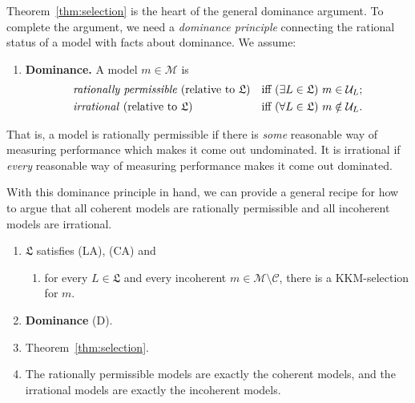 \documentclass[11pt]{article}
\theoremstyle{definition}
\theoremstyle{remark}
\newcommand{\M}{\mathcal M}
\newcommand{\C}{\mathcal C}
\newcommand{\U}{\mathcal U}
\newcommand{\Lf}{\mathfrak L}
\begin{document}
Theorem~\ref{thm:selection} is the heart of the general dominance argument. To complete the argument, we need a \textit{dominance principle} connecting the rational status of a model with facts about dominance. We assume:
\begin{enumerate}[label=\textbf{(D)},leftmargin=*]
\item\label{principle:dominance} \textbf{Dominance.} A model $m\in\M$ is
\begin{align*}
&\text{\emph{rationally permissible} (relative to $\Lf$)}&&\text{iff }(\exists L\in\Lf)\ m\in\U_L;\\
&\text{\emph{irrational} (relative to $\Lf$)}&&\text{iff }(\forall L\in\Lf)\ m\notin\U_L.
\end{align*}
\end{enumerate}
That is, a model is rationally permissible if there is \textit{some} reasonable way of measuring performance which makes it come out undominated. It is irrational if \textit{every} reasonable way of measuring performance makes it come out dominated.







With this dominance principle in hand, we can provide a general recipe for how to argue that all coherent models are rationally permissible and all incoherent models are irrational.
\begin{enumerate}[label=\textbf{(P\arabic*)},leftmargin=*]
\item $\Lf$ satisfies (LA), (CA) and
\begin{enumerate}
\item[(S)]\label{condition:selection} for every $L\in\Lf$ and every incoherent $m\in\M\setminus\C$, there is a KKM-selection for $m$.
\end{enumerate}
\item \textbf{Dominance} (D).
\item Theorem~\ref{thm:selection}.
\item[\textbf{(C)}]\label{conclusion:complete-class} The rationally permissible models are exactly the coherent models, and the irrational models are exactly the incoherent models.
\end{enumerate}
\end{document}
